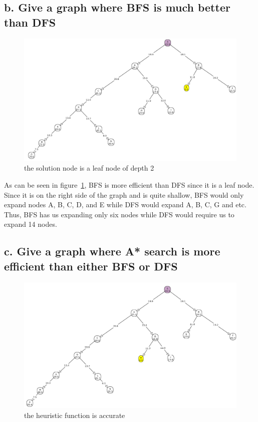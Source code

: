 \documentclass[11pt, A4]{article}
\begin{document}
\subsection*{b. Give a graph where BFS is much better than DFS}

\begin{figure}[H]
\centering
\includegraphics[width = \textwidth]{./1b.png}
    \caption{the solution node is a leaf node of depth 2}
    \label{fig:1b}
\end{figure}

As can be seen in figure~\ref{fig:1b}, BFS is more efficient than DFS since it is a leaf node. Since it is on the right side of the graph and is quite shallow, BFS would only expand nodes A, B, C, D, and E while DFS would expand A, B, C, G and etc. Thus, BFS has us expanding only six nodes while DFS would require us to expand 14 nodes.

\subsection*{c. Give a graph where A* search is more efficient than either BFS or DFS}

\begin{figure}[H]
\centering
\includegraphics[width = \textwidth]{./1c.png}
    \caption{the heuristic function is accurate}
    \label{fig:1c}
\end{figure}
\end{document}
